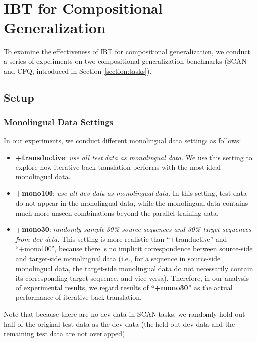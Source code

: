\documentclass[letterpaper]{article} %
\begin{document}
\section{IBT for Compositional Generalization}
\label{section:c1}

To examine the effectiveness of IBT for compositional generalization, we conduct a series of experiments on two compositional generalization benchmarks (SCAN and CFQ, introduced in Section~\ref{section:tasks}).

\subsection{Setup}
\label{sec:ibt_setup}
\subsubsection{Monolingual Data Settings}
In our experiments, we conduct different monolingual data settings as follows:
\begin{itemize}
    \item \textbf{+transductive}:
    \emph{use all test data as monolingual data.}
    We use this setting to explore how iterative back-translation performs with the most ideal monolingual data.
    \item \textbf{+mono100}:
    \emph{use all dev data as monolingual data.}
    In this setting, test data do not appear in the monolingual data, while the monolingual data contains much more unseen combinations beyond the parallel training data.
    \item \textbf{+mono30}:
    \emph{randomly sample 30\% source sequences and 30\% target sequences from dev data.}
    This setting is more realistic than ``+tranductive'' and ``+mono100'', because there is no implicit correspondence between source-side and target-side monolingual data (i.e., for a sequence in source-side monolingual data, the target-side monolingual data do not necessarily contain its corresponding target sequence, and vice versa).
    Therefore, in our analysis of experimental results, we regard results of \textbf{``+mono30"} as the actual performance of iterative back-translation.
\end{itemize}

Note that because there are no dev data in SCAN tasks, we randomly hold out half of the original test data as the dev data (the held-out dev data and the remaining test data are not overlapped).
\end{document}
